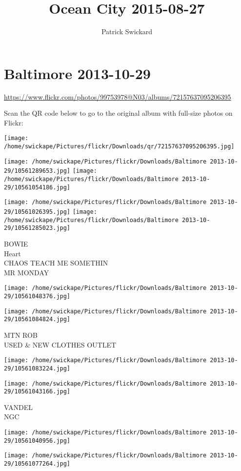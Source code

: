 \documentclass[10pt,letterpaper]{article}
\title{Ocean City 2015-08-27}
\author{Patrick Swickard}
\date{}
\begin{document}
\section*{Baltimore 2013-10-29}

\url{https://www.flickr.com/photos/99753978@N03/albums/72157637095206395}

Scan the QR code below to go to the original album with full-size photos on Flickr:

\texttt{[image: /home/swickape/Pictures/flickr/Downloads/qr/72157637095206395.jpg]}
\pagebreak

\texttt{[image: /home/swickape/Pictures/flickr/Downloads/Baltimore 2013-10-29/10561289653.jpg]}
\texttt{[image: /home/swickape/Pictures/flickr/Downloads/Baltimore 2013-10-29/10561054186.jpg]}

\texttt{[image: /home/swickape/Pictures/flickr/Downloads/Baltimore 2013-10-29/10561026395.jpg]}
\texttt{[image: /home/swickape/Pictures/flickr/Downloads/Baltimore 2013-10-29/10561285023.jpg]}

BOWIE\\
Heart\\
CHAOS TEACH ME SOMETHIN\\
MR MONDAY
\pagebreak

\texttt{[image: /home/swickape/Pictures/flickr/Downloads/Baltimore 2013-10-29/10561048376.jpg]}

\vspace{0.25in}
\texttt{[image: /home/swickape/Pictures/flickr/Downloads/Baltimore 2013-10-29/10561084824.jpg]}

MTN ROB\\
USED \& NEW CLOTHES OUTLET
\pagebreak

\texttt{[image: /home/swickape/Pictures/flickr/Downloads/Baltimore 2013-10-29/10561083224.jpg]}

\vspace{0.25in}
\texttt{[image: /home/swickape/Pictures/flickr/Downloads/Baltimore 2013-10-29/10561043166.jpg]}

VANDEL\\
NGC
\pagebreak

\texttt{[image: /home/swickape/Pictures/flickr/Downloads/Baltimore 2013-10-29/10561040956.jpg]}

\vspace{0.25in}
\texttt{[image: /home/swickape/Pictures/flickr/Downloads/Baltimore 2013-10-29/10561077264.jpg]}
\end{document}

